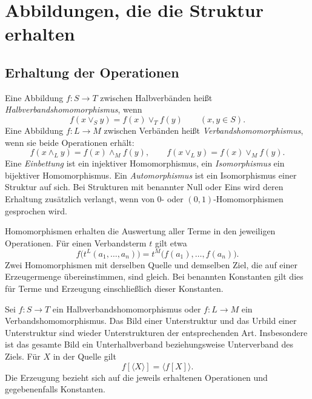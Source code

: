 \chapter{Abbildungen, die die Struktur erhalten}
\label{b45guide:ch:homomorphisms}

\section{Erhaltung der Operationen}

\begin{definition}
\label{b45guide:def:hom}
Eine Abbildung $f:S\to T$ zwischen Halbverbänden heißt
\emph{Halbverbandshomomorphismus}, wenn
\[
 f(x\vee_S y)=f(x)\vee_T f(y)\qquad(x,y\in S).
\]
Eine Abbildung $f:L\to M$ zwischen Verbänden heißt
\emph{Verbandshomomorphismus}, wenn sie beide Operationen erhält:
\[
 f(x\wedge_L y)=f(x)\wedge_M f(y),\qquad
 f(x\vee_L y)=f(x)\vee_M f(y).
\]
Eine \emph{Einbettung} ist ein injektiver Homomorphismus, ein
\emph{Isomorphismus} ein bijektiver Homomorphismus.
Ein \emph{Automorphismus} ist ein Isomorphismus einer Struktur auf sich.
Bei Strukturen mit benannter Null oder Eins wird deren Erhaltung
zusätzlich verlangt, wenn von $0$- oder $(0,1)$-Homomorphismen
gesprochen wird.
\end{definition}

\begin{theorem}
\label{b45guide:thm:term-preservation}
Homomorphismen erhalten die Auswertung aller Terme in den
jeweiligen Operationen. Für einen Verbandsterm $t$ gilt etwa
\[
 f\bigl(t^L(a_1,\ldots,a_n)\bigr)
   =t^M\bigl(f(a_1),\ldots,f(a_n)\bigr).
\]
Zwei Homomorphismen mit derselben Quelle und demselben Ziel,
die auf einer Erzeugermenge übereinstimmen, sind gleich.
Bei benannten Konstanten gilt dies für Terme und Erzeugung
einschließlich dieser Konstanten.
\end{theorem}

\begin{theorem}
\label{b45guide:thm:hom-substructures}
Sei $f:S\to T$ ein Halbverbandshomomorphismus oder
$f:L\to M$ ein Verbandshomomorphismus.
Das Bild einer Unterstruktur und das Urbild einer Unterstruktur
sind wieder Unterstrukturen der entsprechenden Art.
Insbesondere ist das gesamte Bild ein Unterhalbverband
beziehungsweise Unterverband des Ziels. Für $X$ in der Quelle gilt
\[
 f[\langle X\rangle]=\langle f[X]\rangle .
\]
Die Erzeugung bezieht sich auf die jeweils erhaltenen Operationen
und gegebenenfalls Konstanten. \cite{supclosed}
\end{theorem}

